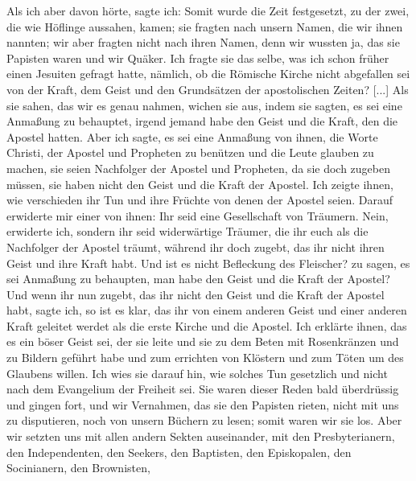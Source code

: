 Als ich aber davon hörte, sagte ich:  Somit wurde die Zeit
festgesetzt, zu der zwei, die wie Höflinge aussahen, kamen; sie
fragten nach unsern Namen, die wir ihnen nannten; wir aber
fragten nicht nach ihren Namen, denn wir wussten ja, das sie
Papisten waren und wir Quäker. Ich fragte sie das selbe, was
ich schon früher einen Jesuiten gefragt hatte, nämlich, ob die
Römische Kirche nicht abgefallen sei von der Kraft, dem Geist
und den Grundsätzen der apostolischen Zeiten? [...] Als sie
sahen, das wir es genau nahmen, wichen sie aus, indem sie sagten,
es sei eine Anmaßung zu behauptet, irgend jemand habe den
Geist und die Kraft, den die Apostel hatten. Aber ich sagte, es
sei eine Anmaßung von ihnen, die Worte Christi, der Apostel und
Propheten zu benützen und die Leute glauben zu machen, sie seien
Nachfolger der Apostel und Propheten, da sie doch zugeben müssen,
sie haben nicht den Geist und die Kraft der Apostel. Ich zeigte
ihnen, wie verschieden ihr Tun und ihre Früchte von denen der
Apostel seien. Darauf erwiderte mir einer von ihnen: \glqq Ihr seid
eine Gesellschaft von Träumern.\grqq{} \glqq Nein,\grqq{} erwiderte ich, 
\glqq sondern ihr seid widerwärtige Träumer, die ihr euch als die 
Nachfolger der Apostel träumt, während ihr doch zugebt, das ihr nicht ihren
Geist und ihre Kraft habt. Und ist es nicht Befleckung des Fleischer?
zu sagen, es sei Anmaßung zu behaupten, man habe den Geist
und die Kraft der Apostel? Und wenn ihr nun zugebt, das ihr
nicht den Geist und die Kraft der Apostel habt,\grqq{} sagte ich, \glqq 
so ist es klar, das ihr von einem anderen Geist und einer anderen
Kraft geleitet werdet als die erste Kirche und die Apostel.\grqq{} Ich
erklärte ihnen, das es ein böser Geist sei, der sie leite und sie zu
dem Beten mit Rosenkränzen und zu Bildern geführt habe und
zum errichten von Klöstern  und zum Töten um des Glaubens
willen. Ich wies sie darauf hin, wie solches Tun gesetzlich und
nicht nach dem Evangelium der Freiheit sei. Sie waren dieser
Reden bald überdrüssig und gingen fort, und wir Vernahmen,
das sie den Papisten rieten, nicht mit uns zu disputieren, noch
von unsern Büchern zu lesen; somit waren wir sie los. Aber
wir setzten uns mit allen andern Sekten auseinander, mit den
Presbyterianern, 
den Independenten, 
den Seekers, 
den Baptisten,
den Episkopalen, 
den Socinianern, 
den Brownisten, 
